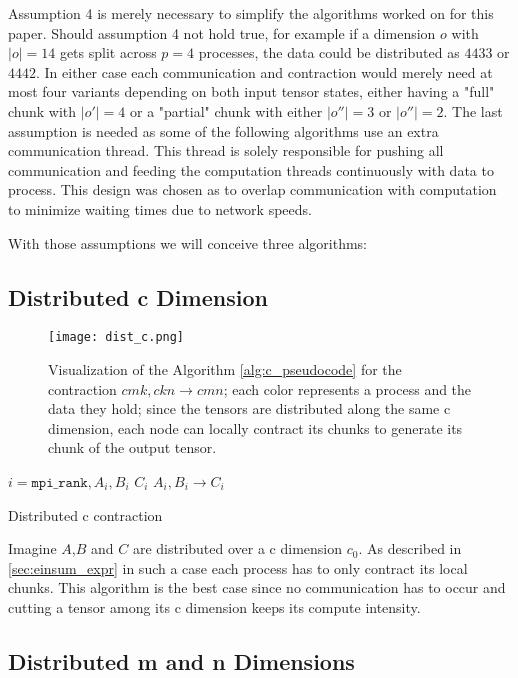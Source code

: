 Assumption 4 is merely necessary to simplify the algorithms worked on for this paper.
Should assumption 4 not hold true, for example if a dimension $o$ with $|o|=14$ gets split across $p=4$ processes, the data could be distributed as $4 4 3 3$ or $4 4 4 2$.
In either case each communication and contraction would merely need at most four variants depending on both input tensor states, either having a "full" chunk with $|o'|=4$ or a "partial" chunk with either $|o''|=3$ or $|o''|=2$.
The last assumption is needed as some of the following algorithms use an extra communication thread.
This thread is solely responsible for pushing all communication and feeding the computation threads continuously with data to process.
This design was chosen as to overlap communication with computation to minimize waiting times due to network speeds.

With those assumptions we will conceive three algorithms:

\subsection{Distributed c Dimension}

\begin{figure}[ht]
    \centering\texttt{[image: dist\_c.png]} 
    \caption{Visualization of the Algorithm \ref{alg:c_pseudocode} for the contraction $cmk,ckn \rightarrow cmn$; 
    each color represents a process and the data they hold; 
    since the tensors are distributed along the same c dimension, each node can locally contract its chunks to generate its chunk of the output tensor.}
    \label{fig:c_algo}
    \end{figure}

\begin{algorithm}[ht]
    \begin{algorithmic}
    \Require $i = \texttt{mpi\_rank}, A_i, B_i$
    \Ensure $C_i$
    \State $A_i, B_i \rightarrow C_i$
\end{algorithmic}
\caption{Distributed c contraction}
\label{alg:c_pseudocode}
\end{algorithm}

Imagine $A$,$B$ and $C$ are distributed over a c dimension $c_0$.
As described in \ref{sec:einsum_expr} in such a case each process has to only contract its local chunks.
This algorithm is the best case since no communication has to occur and cutting a tensor among its c dimension keeps its compute intensity.

\subsection{Distributed m and n Dimensions}


